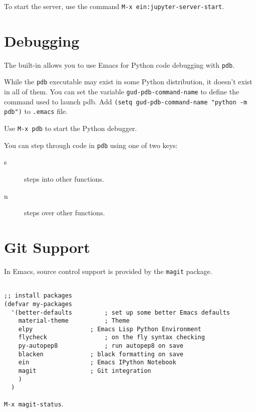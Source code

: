 To start the server, use the command \verb|M-x ein:jupyter-server-start|.

\section{Debugging}
The built-in  allows you to use Emacs for Python code debugging with \verb|pdb|.

\begin{tcolorbox}
  While the \verb|pdb| executable may exist in some Python distribution, it doesn't exist in all of them.
  You can set the variable \verb|gud-pdb-command-name| to define the command used to launch pdb.
  Add \verb|(setq gud-pdb-command-name "python -m pdb")| to \verb|.emacs| file.
\end{tcolorbox}

Use \verb|M-x pdb| to start the Python debugger.


You can step through code in \verb|pdb| using one of two keys:
\begin{description}
\item [s] steps into other functions.
\item [n] steps over other functions.
\end{description}


\section{Git Support}
In Emacs, source control support is provided by the \verb|magit| package.

\begin{lstlisting}
  
;; install packages
(defvar my-packages
  '(better-defaults			; set up some better Emacs defaults
    material-theme			; Theme
    elpy				; Emacs Lisp Python Environment
    flycheck				; on the fly syntax checking
    py-autopep8				; run autopep8 on save
    blacken				; black formatting on save
    ein					; Emacs IPython Notebook
    magit				; Git integration
    )
  )
\end{lstlisting}

\verb|M-x magit-status|.
